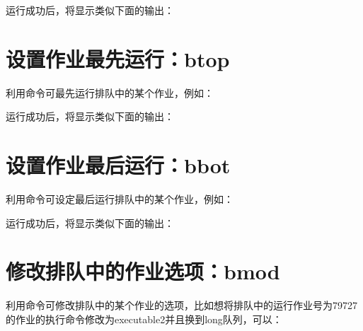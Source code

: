 \documentclass[a4paper,12pt,english]{sphinxmanual}
\begin{document}
\sphinxAtStartPar
运行成功后，将显示类似下面的输出：

\begin{sphinxVerbatim}[commandchars=\\\{\}]
    
\end{sphinxVerbatim}


\section{设置作业最先运行：btop}
\label{\detokenize{lsf/lsf:btop}}
\sphinxAtStartPar
利用命令可最先运行排队中的某个作业，例如：

\sphinxAtStartPar
{}

\sphinxAtStartPar
运行成功后，将显示类似下面的输出：

\begin{sphinxVerbatim}[commandchars=\\\{\}]
         
\end{sphinxVerbatim}


\section{设置作业最后运行：bbot}
\label{\detokenize{lsf/lsf:bbot}}
\sphinxAtStartPar
利用命令可设定最后运行排队中的某个作业，例如：

\sphinxAtStartPar
{}

\sphinxAtStartPar
运行成功后，将显示类似下面的输出：

\begin{sphinxVerbatim}[commandchars=\\\{\}]
         
\end{sphinxVerbatim}


\section{修改排队中的作业选项：bmod}
\label{\detokenize{lsf/lsf:bmod}}
\sphinxAtStartPar
利用命令可修改排队中的某个作业的选项，比如想将排队中的运行作业号为79727的作业的执行命令修改为executable2并且换到long队列，可以：
\end{document}
